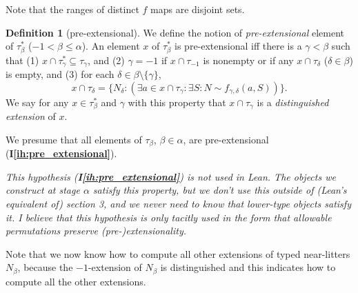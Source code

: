 \documentclass[112pt]{article}
\theoremstyle{definition}
\newtheorem{definition}[theorem]{Definition}
\theoremstyle{remark}
\newcommand{\ihref}[1]{(\textbf{I\ref{#1}})}
\newcommand{\rk}[1]{{\color{blue}\sl #1}}
\newenvironment{annot}{\begin{center}\color{blue}\sl}{\end{center}}
\begin{document}
Note that the ranges of distinct $f$ maps are disjoint sets. %

\begin{definition}[pre-extensional]\label{def:pre_extensional}
We define the notion of {\em pre-extensional\/} element of $\tau^*_\beta$ ($-1 <\beta \leq \alpha$).   An element $x$ of $\tau^*_\beta$ is pre-extensional iff there is a $\gamma<\beta$ such that (1) $x \cap \tau^*_\gamma \subseteq \tau_\gamma$, and (2) $\gamma=-1$ if
$x \cap \tau_{-1}$ is nonempty or if any $x \cap \tau_\delta$ ($\delta \in \beta$) is empty,  and (3) for each $\delta \in \beta \setminus \{\gamma\}$, $$x \cap \tau_\delta= \{N_\delta:(\exists a \in x\cap \tau_\gamma:\exists S:N \sim f_{\gamma,\delta}(a,S))\}.$$  We say for any $x \in \tau^*_\beta$ and $\gamma$ with this property that $x \cap \tau_\gamma$ is a {\em distinguished extension\/} of $x$.
\end{definition}

We presume that all elements of $\tau_\beta$, $\beta\in \alpha$, are pre-extensional \ihref{ih:pre_extensional}.

\begin{annot}
  This hypothesis \ihref{ih:pre_extensional} is not used in Lean.
  The objects we construct at stage $\alpha$ satisfy this property, but we don't use this outside of (Lean's equivalent of) section 3, and we never need to know that lower-type objects satisfy it.
  I believe that this hypothesis is only tacitly used in the form that allowable permutations preserve (pre-)extensionality.
\end{annot}



Note that we now know how to compute all other extensions of typed near-litters $N_\beta$, because the $-1$-extension of $N_\beta$ is distinguished and this indicates how to compute all the other extensions.
\end{document}

